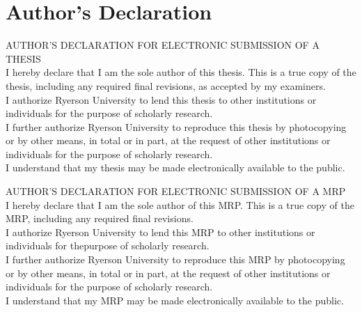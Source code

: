 

\chapter*{Author's Declaration} \label{authors-declaration}

{%

AUTHOR'S DECLARATION FOR ELECTRONIC SUBMISSION OF A THESIS \\

I hereby declare that I am the sole author of this thesis. This is a true copy of the thesis, including any required final revisions, as accepted by my examiners.\\

I authorize Ryerson University to lend this thesis to other institutions or individuals for the purpose of scholarly research. \\

I further authorize Ryerson University to reproduce this thesis by photocopying or by other means, in total or in part, at the request of other institutions or individuals for the purpose of scholarly research. \\

I understand that my thesis may be made electronically available to the public.

{%

AUTHOR'S DECLARATION FOR ELECTRONIC SUBMISSION OF A MRP \\

I hereby declare that I am the sole author of this MRP. This is a true copy of the MRP, including any required final revisions.\\

I authorize Ryerson University to lend this MRP to other institutions or individuals for thepurpose of scholarly research. \\

I further authorize Ryerson University to reproduce this MRP by photocopying or by other means, in total or in part, at the request of other institutions or individuals for the purpose of scholarly research.\\

I understand that my MRP may be made electronically available to the public.

}}
